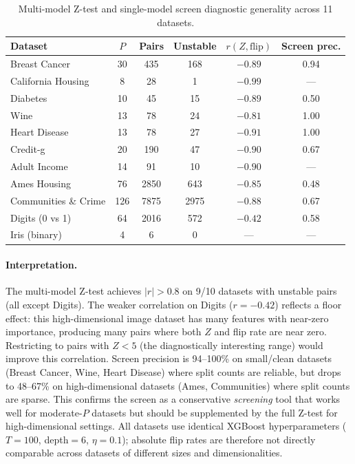 \documentclass{article}
\begin{document}
\begin{table}[t]
\centering
\caption{Multi-model Z-test and single-model screen diagnostic generality across 11 datasets.}
\label{tab:f1-generality}
\small
\begin{tabular}{@{}lccccc@{}}
\toprule
Dataset & $P$ & Pairs & Unstable & $r(Z, \text{flip})$ & Screen prec. \\
\midrule
Breast Cancer & 30 & 435 & 168 & $-0.89$ & 0.94 \\
California Housing & 8 & 28 & 1 & $-0.99$ & --- \\
Diabetes & 10 & 45 & 15 & $-0.89$ & 0.50 \\
Wine & 13 & 78 & 24 & $-0.81$ & 1.00 \\
Heart Disease & 13 & 78 & 27 & $-0.91$ & 1.00 \\
Credit-g & 20 & 190 & 47 & $-0.90$ & 0.67 \\
Adult Income & 14 & 91 & 10 & $-0.90$ & --- \\
Ames Housing & 76 & 2850 & 643 & $-0.85$ & 0.48 \\
Communities \& Crime & 126 & 7875 & 2975 & $-0.88$ & 0.67 \\
Digits (0 vs 1) & 64 & 2016 & 572 & $-0.42$ & 0.58 \\
Iris (binary) & 4 & 6 & 0 & --- & --- \\
\bottomrule
\end{tabular}
\end{table}

\paragraph{Interpretation.}
\begin{sloppypar}
The multi-model Z-test achieves $|r| > 0.8$ on 9/10 datasets with unstable pairs (all
except Digits). The weaker correlation on Digits ($r = -0.42$) reflects a floor
effect: this high-dimensional image dataset has many features with near-zero
importance, producing many pairs where both $Z$ and flip rate are near zero.
Restricting to pairs with $Z < 5$ (the diagnostically interesting range) would
improve this correlation. Screen precision is 94--100\% on small/clean datasets (Breast
Cancer, Wine, Heart Disease) where split counts are reliable, but drops to 48--67\%
on high-dimensional datasets (Ames, Communities) where split counts are sparse.
This confirms the screen as a conservative \emph{screening} tool that works well for
moderate-$P$ datasets but should be supplemented by the full Z-test for
high-dimensional settings. All datasets use identical XGBoost hyperparameters
($T{=}100$, depth${=}6$, $\eta{=}0.1$); absolute flip rates are therefore not
directly comparable across datasets of different sizes and dimensionalities.
\end{sloppypar}
\end{document}
